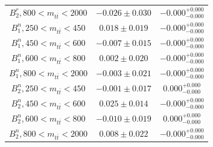 \begin{table}[htb]
\begin{tabular}{c | c c}
$B_{2}^{r}, {800 < m_{t\bar{t}} < 2000}$ & $-0.026 \pm 0.030$ & $-0.000^{+0.000}_{-0.000}$ \\
$B_{1}^{n}, {250 < m_{t\bar{t}} < 450}$ & $0.018 \pm 0.019$ & $-0.000^{+0.000}_{-0.000}$ \\
$B_{1}^{n}, {450 < m_{t\bar{t}} < 600}$ & $-0.007 \pm 0.015$ & $-0.000^{+0.000}_{-0.000}$ \\
$B_{1}^{n}, {600 < m_{t\bar{t}} < 800}$ & $0.002 \pm 0.020$ & $-0.000^{+0.000}_{-0.000}$ \\
$B_{1}^{n}, {800 < m_{t\bar{t}} < 2000}$ & $-0.003 \pm 0.021$ & $-0.000^{+0.000}_{-0.000}$ \\
$B_{2}^{n}, {250 < m_{t\bar{t}} < 450}$ & $-0.001 \pm 0.017$ & $0.000^{+0.000}_{-0.000}$ \\
$B_{2}^{n}, {450 < m_{t\bar{t}} < 600}$ & $0.025 \pm 0.014$ & $-0.000^{+0.000}_{-0.000}$ \\
$B_{2}^{n}, {600 < m_{t\bar{t}} < 800}$ & $-0.010 \pm 0.019$ & $0.000^{+0.000}_{-0.000}$ \\
$B_{2}^{n}, {800 < m_{t\bar{t}} < 2000}$ & $0.008 \pm 0.022$ & $-0.000^{+0.000}_{-0.000}$ \\
\hline
\end{tabular}
\label{tab:Extracted_Coefficients_2D_Polarizations}
\end{table}

